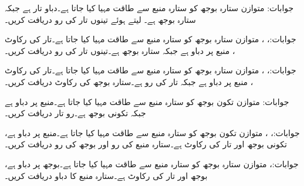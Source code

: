 جوابات:
متوازن ستارہ بوجھ کو ستارہ منبع  سے طاقت مہیا کیا جاتا ہے۔دباو تار  ہے جبکہ ستارہ بوجھ  ہے۔ لیتے ہوئے تینوں تار کی رو دریافت کریں۔

جوابات:، ، 
متوازن ستارہ بوجھ کو ستارہ منبع  سے طاقت مہیا کیا جاتا ہے۔تار کی رکاوٹ ، منبع پر دباو
  ہے جبکہ ستارہ بوجھ  ہے۔تینوں تار کی رو دریافت کریں۔

جوابات:، ، 
متوازن ستارہ بوجھ کو ستارہ منبع  سے طاقت مہیا کیا جاتا ہے۔تار کی رکاوٹ ، منبع پر دباو   ہے جبکہ تار کی رو  ہے۔ستارہ بوجھ کی رکاوٹ دریافت کریں۔

جوابات:
متوازن تکون بوجھ کو ستارہ منبع  سے طاقت مہیا کیا جاتا ہے۔منبع پر دباو   ہے جبکہ تکونی بوجھ
  ہے۔رو تار دریافت کریں۔

جوابات:، ، 
متوازن تکون بوجھ کو ستارہ منبع  سے طاقت مہیا کیا جاتا ہے۔منبع پر دباو   ہے، تکونی بوجھ
  اور تار کی رکاوٹ  ہے۔ستارہ منبع کی رو  اور بوجھ کی رو  دریافت کریں۔

جوابات:، 
متوازن ستارہ بوجھ کو ستارہ منبع  سے طاقت مہیا کیا جاتا ہے۔بوجھ پر دباو   ہے،  بوجھ
  اور تار کی رکاوٹ  ہے۔ستارہ منبع کا دباو  دریافت کریں۔

